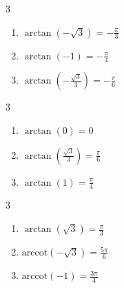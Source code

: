 \documentclass{ximera}
\begin{document}
\begin{multicols}{3} 

\begin{enumerate}

\setcounter{enumi}{\value{HW}}

\item $\arctan \left( -\sqrt{3} \right) = -\frac{\pi}{3}$ 
\item $\arctan \left( -1 \right) = -\frac{\pi}{4}$ 
\item $\arctan \left( -\frac{\sqrt{3}}{3} \right) = -\frac{\pi}{6}$

\setcounter{HW}{\value{enumi}}

\end{enumerate}

\end{multicols}

\begin{multicols}{3} 

\begin{enumerate}

\setcounter{enumi}{\value{HW}}

\item $\arctan \left( 0 \right) = 0$ 
\item $\arctan \left( \frac{\sqrt{3}}{3} \right) = \frac{\pi}{6}$
\item $\arctan \left( 1 \right) = \frac{\pi}{4}$ 

\setcounter{HW}{\value{enumi}}

\end{enumerate}

\end{multicols}

\begin{multicols}{3} 

\begin{enumerate}

\setcounter{enumi}{\value{HW}}

\item $\arctan \left( \sqrt{3} \right) = \frac{\pi}{3}$ 
\item $\mbox{arccot} \left( -\sqrt{3} \right) = \frac{5\pi}{6}$
\item $\mbox{arccot} \left( -1 \right) = \frac{3\pi}{4}$

\setcounter{HW}{\value{enumi}}

\end{enumerate}

\end{multicols}
\end{document}
